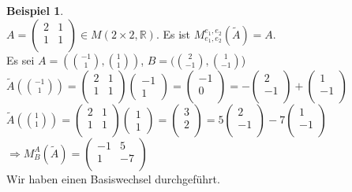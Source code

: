 \documentclass[10pt,a4paper,numbers=endperiod]{scrartcl}
\theoremstyle{definition}
\newtheorem{bsp}[satz]{Beispiel}
\def\RR{{\mathbb R}}
\begin{document}
\begin{bsp}
	$ $\\
	$A= \begin{pmatrix}
	2&1\\
	1&1\\
	\end{pmatrix} \in M(2 \times 2,\RR)$. Es ist $M_{e_1,e_2}^{e_1,e_2} (\tilde{A}) = A$.\\
	Es sei $A = (\binom{-1}{1}, \binom{1}{1})$, $B = (\binom{2}{-1}, \binom{1}{-1}$)\\
	
	$\tilde{A}(\binom{-1}{1}) = \begin{pmatrix}
	2&1\\
	1&1\\
	\end{pmatrix} \begin{pmatrix}
	-1\\1
	\end{pmatrix} = \begin{pmatrix}
	-1\\0\\
	\end{pmatrix} = - \begin{pmatrix}
	2\\-1\\
	\end{pmatrix} + \begin{pmatrix}
	1\\ -1\\
	\end{pmatrix}$\\
	
	$\tilde{A}(\binom{1}{1}) = \begin{pmatrix}
	2&1\\
	1&1\\
	\end{pmatrix} \begin{pmatrix}
	1\\1
	\end{pmatrix} = \begin{pmatrix}
	3\\2\\
	\end{pmatrix} = 5 \begin{pmatrix}
	2\\-1\\
	\end{pmatrix} -7 \begin{pmatrix}
	1\\ -1\\
	\end{pmatrix}$\\
	
	$\Rightarrow M_B^A(\tilde{A}) = \begin{pmatrix}
	-1&5\\
	1&-7\\
	\end{pmatrix}$\\
	Wir haben einen Basiswechsel durchgeführt.
\end{bsp}
\end{document}
